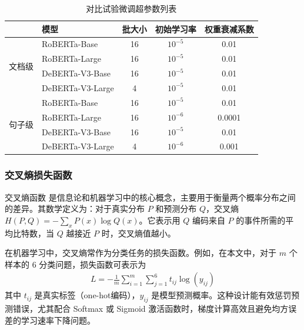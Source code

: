 \begin{table}[htbp]
\centering
\caption{对比试验微调超参数列表}
\label{tab:hyper-parameters}
\begin{tabular}{c|l|ccc}
\toprule
                          & \textbf{模型}   & \textbf{批大小} & \textbf{初始学习率} & \textbf{权重衰减系数} \\ \midrule
\multirow{4}{*}{文档级}    & RoBERTa-Base     & 16                  & $10^{-5}$                & 0.01                  \\
                          & RoBERTa-Large    & 16                  & $10^{-5}$                & 0.01                  \\
                          & DeBERTa-V3-Base  & 16                  & $10^{-5}$                & 0.01                  \\
                          & DeBERTa-V3-Large & 4                   & $10^{-5}$                & 0.01                  \\ \midrule
\multirow{4}{*}{句子级}    & RoBERTa-Base     & 16                  & $10^{-5}$                & 0.01                  \\
                          & RoBERTa-Large    & 16                  & $10^{-6}$               & 0.0001                \\
                          & DeBERTa-V3-Base  & 16                  & $10^{-5}$                & 0.01                  \\
                          & DeBERTa-V3-Large & 4                   & $10^{-6}$               & 0.001                 \\ \bottomrule
\end{tabular}
\end{table}

\subsubsection{交叉熵损失函数}

交叉熵函数 \cite{CrossEntropy} 是信息论和机器学习中的核心概念，主要用于衡量两个概率分布之间的差异。其数学定义为：对于真实分布 $P$ 和预测分布 $Q$，交叉熵 $H(P,Q)=-\sum_x P(x)\log Q(x)$。它表示用 $Q$ 编码来自 $P$ 的事件所需的平均比特数，当 $Q$ 越接近 $P$ 时，交叉熵值越小。

在机器学习中，交叉熵常作为分类任务的损失函数。例如，在本文中，对于 $m$ 个样本的 $6$ 分类问题，损失函数可表示为 
\begin{align}
L=-\frac{1}{m}\sum_{i=1}^m \sum_{j=1}^6 t_{ij}\log(y_{ij})
\end{align}
其中 $t_{ij}$ 是真实标签（one-hot编码），$y_{ij}$ 是模型预测概率。这种设计能有效惩罚预测错误，尤其配合 Softmax 或 Sigmoid 激活函数时，梯度计算高效且避免均方误差的学习速率下降问题。

